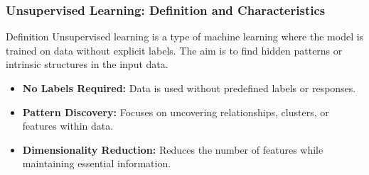 \documentclass[aspectratio=169]{beamer}
\begin{document}
\begin{frame}[fragile]
    \frametitle{Unsupervised Learning: Definition and Characteristics}
    \begin{block}{Definition}
        Unsupervised learning is a type of machine learning where the model is trained on data without explicit labels. The aim is to find hidden patterns or intrinsic structures in the input data.
    \end{block}
    
    \begin{itemize}
        \item \textbf{No Labels Required:} Data is used without predefined labels or responses.
        \item \textbf{Pattern Discovery:} Focuses on uncovering relationships, clusters, or features within data.
        \item \textbf{Dimensionality Reduction:} Reduces the number of features while maintaining essential information.
    \end{itemize}
\end{frame}
\end{document}

